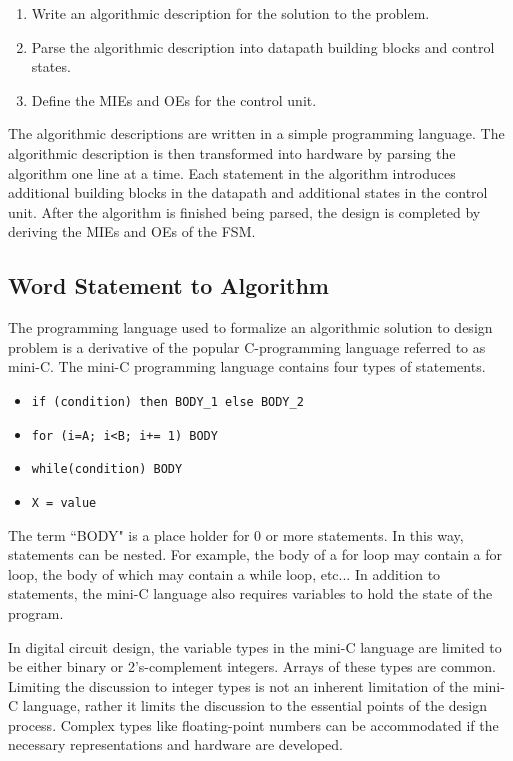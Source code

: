 \begin{enumerate}
\item Write an algorithmic description for the solution to the problem.
\item Parse the algorithmic description into datapath building blocks and control states.
\item Define the MIEs and OEs for the control unit.
\end{enumerate}

The algorithmic descriptions are written in a simple programming language.
The algorithmic description is then transformed into hardware by
parsing the algorithm one line at a time.  Each statement in the 
algorithm introduces additional building blocks in the datapath and
additional states in the control unit.  After the algorithm is finished
being parsed, the design is completed by deriving the MIEs and OEs of the 
FSM.

\subsection{Word Statement to Algorithm}
The programming language used to formalize an algorithmic
solution to design problem is a derivative of the popular C-programming
language referred to as mini-C.  The mini-C programming language contains
four types of statements.

\begin{itemize}
\item \verb^if (condition) then BODY_1 else BODY_2^
\item \verb^for (i=A; i<B; i+= 1) BODY^
\item \verb^while(condition) BODY^
\item \verb^X = value^
\end{itemize}

The term ``BODY" is a place holder for 0 or more statements.  In this way, 
statements can be nested.  For example, the body of a for loop may contain
a for loop, the body of which may contain a while loop, etc...  In addition
to statements, the mini-C language also requires variables to hold the state
of the program.

In digital circuit design, the variable types in the mini-C language 
are limited to be either binary or 2's-complement integers.  Arrays 
of these types are common.  Limiting the discussion to integer types  
is not an inherent limitation of the mini-C language, rather it limits
the discussion to the essential points of the design process.  Complex
types like floating-point numbers can be accommodated if the necessary
representations and hardware are developed.

